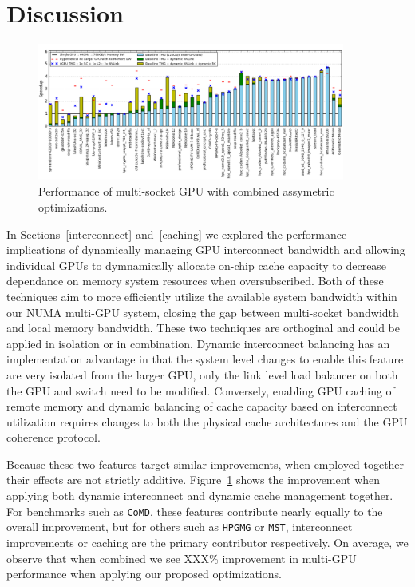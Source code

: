 \section {Discussion}

\label{discussion}
\begin{figure}[tp]
    \centering
    \includegraphics[width=0.9\textwidth]{figures/resultscombined.jpg}
    \caption{Performance of multi-socket GPU with combined assymetric 
optimizations.}
    \label{fig:combined}
\end{figure}

In Sections~\ref{interconnect} and~\ref{caching} we explored the performance 
implications of dynamically managing GPU interconnect bandwidth and allowing 
individual GPUs to dymnamically allocate on-chip cache capacity to decrease 
dependance on memory system resources when oversubscribed.  Both of these 
techniques aim to more efficiently utilize the available system bandwidth within 
our NUMA multi-GPU system, closing the gap between multi-socket bandwidth and 
local memory bandwidth.  These two techniques are orthoginal and could be 
applied in isolation or in combination.  Dynamic interconnect balancing has an 
implementation advantage in that the system level changes to enable this feature 
are very isolated from the larger GPU, only the link level load balancer on both 
the GPU and switch need to be modified.  Conversely, enabling GPU caching of 
remote memory and dynamic balancing of cache capacity based on interconnect 
utilization requires changes to both the physical cache architectures and the 
GPU coherence protocol.

Because these two features target similar improvements, when employed together 
their effects are not strictly additive.  Figure~\ref{fig:combined} shows the 
improvement when applying both dynamic interconnect and dynamic cache management 
together.  For benchmarks such as \texttt{CoMD}, these features contribute 
nearly equally to the overall improvement, but for others such as 
\texttt{HPGMG} or \texttt{MST}, interconnect improvements or caching are the 
primary contributor respectively.  On average, we observe that when combined we 
see XXX\% improvement in multi-GPU performance when applying our proposed 
optimizations.

